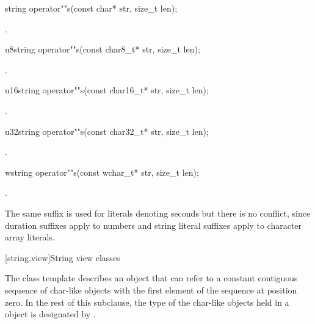 %
\begin{itemdecl}
string operator""s(const char* str, size_t len);
\end{itemdecl}

\begin{itemdescr}
\pnum
\returns
{}.
\end{itemdescr}

%
\begin{itemdecl}
u8string operator""s(const char8_t* str, size_t len);
\end{itemdecl}
\begin{itemdescr}
\pnum
\returns
{}.
\end{itemdescr}

%
\begin{itemdecl}
u16string operator""s(const char16_t* str, size_t len);
\end{itemdecl}
\begin{itemdescr}
\pnum
\returns
{}.
\end{itemdescr}

%
\begin{itemdecl}
u32string operator""s(const char32_t* str, size_t len);
\end{itemdecl}
\begin{itemdescr}
\pnum
\returns
{}.
\end{itemdescr}

%
\begin{itemdecl}
wstring operator""s(const wchar_t* str, size_t len);
\end{itemdecl}
\begin{itemdescr}
\pnum
\returns
{}.
\end{itemdescr}

\pnum \begin{note}
The same suffix  is used for  literals denoting seconds but there is no conflict, since duration suffixes apply to numbers and string literal suffixes apply to character array literals.
\end{note}

[string.view]{String view classes}

\pnum
The class template  describes an object that can refer to a constant contiguous sequence of char-like objects with the first element of the sequence at position zero.
In the rest of this subclause, the type of the char-like objects held in a  object is designated by .

